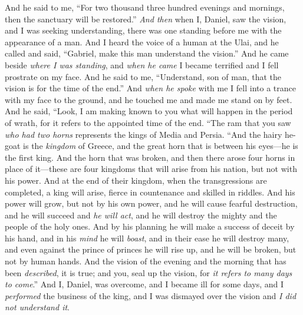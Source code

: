 \begin{biblechapter}
\verse And he said to me, “For two thousand three hundred evenings and mornings, then the sanctuary will be restored.”
 \textit{And then} when I, Daniel, saw the vision, and I was seeking understanding, there was one standing before me with the appearance of a man.
\verse And I heard the voice of a human at the Ulai, and he called and said, “Gabriel, make this man understand the vision.”
\verse And he came beside \textit{where I was standing}, and \textit{when he came} I became terrified and I fell prostrate on my face. And he said to me, “Understand, son of man, that the vision is for the time of the end.”
\verse And \textit{when he spoke} with me I fell into a trance with my face to the ground, and he touched me and made me stand on by feet.
\verse And he said, “Look, I am making known to you what will happen in the period of wrath, for it refers to the appointed time of the end.
\verse “The ram that you saw \textit{who had two horns} represents the kings of Media and Persia.
\verse “And the hairy he-goat is the \textit{kingdom} of Greece, and the great horn that is between his eyes—he is the first king.
\verse And the horn that was broken, and then there arose four horns in place of it—these are four kingdoms that will arise from his nation, but not with his power.
\verse And at the end of their kingdom, when the transgressions are completed, a king will arise, fierce in countenance and skilled in riddles.
\verse And his power will grow, but not by his own power, and he will cause fearful destruction, and he will succeed and \textit{he will act}, and he will destroy the mighty and the people of the holy ones.
\verse And by his planning he will make a success of deceit by his hand, and in his \textit{mind} he will \textit{boast}, and in their ease he will destroy many, and even against the prince of princes he will rise up, and he will be broken, but not by human hands.
\verse And the vision of the evening and the morning that has been \textit{described}, it is true; and you, seal up the vision, for \textit{it refers to many days to come}.”
\verse And I, Daniel, was overcome, and I became ill for some days, and I \textit{performed} the business of the king, and I was dismayed over the vision and \textit{I did not understand it}.
\end{biblechapter}

